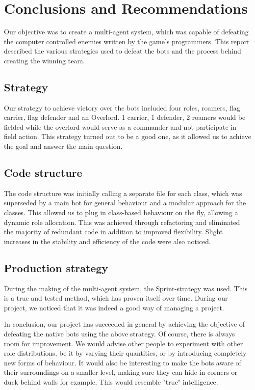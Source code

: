 \chapter{Conclusions and Recommendations}

Our objective was to create a multi-agent system, which was capable of defeating the computer controlled enemies written by the game's programmers. This report described the various strategies used to defeat the bots and the process behind creating the winning team.
    
\section{Strategy}
Our strategy to achieve victory over the bots included four roles, roamers, flag carrier, flag defender and an Overlord. 1 carrier, 1 defender, 2 roamers would be fielded while the overlord would serve as a commander and not participate in field action. This strategy turned out to be a good one, as it allowed us to achieve the goal and answer the main question.

\section{Code structure}
The code structure was initially calling a separate file for each class, which was superseded by a main bot for general behaviour and a modular approach for the classes. This allowed us to plug in class-based behaviour on the fly, allowing a dynamic role allocation. This was achieved through refactoring and eliminated the majority of redundant code in addition to improved flexibility. Slight increases in the stability and efficiency of the code were also noticed.

\section{Production strategy}
During the making of the multi-agent system, the Sprint-strategy was used. This is a true and tested method, which has proven itself over time. During our project, we noticed that it was indeed a good way of managing a project.

In conclusion, our project has succeeded in general by achieving the objective of defeating the native bots using the above strategy. Of course, there is always room for improvement. We would advise other people to experiment with other role distributions, be it by varying their quantities, or by introducing completely new forms of behaviour. It would also be interesting to make the bots aware of their surroundings on a smaller level, making sure they can hide in corners or duck behind walls for example. This would resemble "true" intelligence.